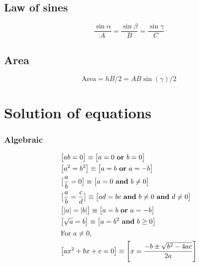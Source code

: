 \documentclass[letterpaper,9pt,fleqn]{extarticle}
\begin{document}
\begin{multicols*}{3}
\subsection*{Law of sines}
\[
    \frac{\sin{\alpha}}{A} =  \frac{\sin{\beta}}{B} =  \frac{\sin{\gamma}}{C}
\]

\subsection*{Area}

\[
    \mbox{Area} = h B / 2=  A B \sin(\gamma) /2
\]


\section*{Solution of equations}
\vspace{-0.2in}
\subsubsection*{Algebraic}
\vspace{-0.2in}
\begin{minipage}[c]{0.1666666666667\textwidth}
\begin{align*}
& \big [a b = 0 \big ] \equiv \big [ a = 0 \mbox{ \textbf{or} } b = 0 \big ]\\
& \big [ a^2 = b^2 \big ] \equiv \big [ a = b \mbox{ \textbf{or} } a = -b \big ]\\
&\big [ \frac{a}{b} = 0 \big ] \equiv \big [ a = 0 \mbox{ \textbf{and} } b \neq 0 \big ] \\
&\big [\frac{a}{b} = \frac{c}{d}  \big ] \equiv \big [ad  = bc \mbox{ \textbf{and}  } b \neq 0  \mbox{ \textbf{and}  }  d \neq 0 \big ] \\
&\big [|a| = |b|  \big ] \equiv \big [a =b \mbox{ \textbf{or} } a = -b \big ]\\
&\big [ \sqrt{a}  = b \big ] \equiv \big [a = b^2 \mbox{ \textbf{and}  } b \ge 0 \big ] \\
\intertext{For \(a \neq 0\),}
& \big [a x^2 + b x + c = 0 \big] \equiv \left [x = \frac{-b \pm \sqrt{b^2 - 4 a c}}{2 a} \right] \\
\end{align*}
\end{minipage}
\vspace{-0.4in}

\end{multicols*}
\end{document}
